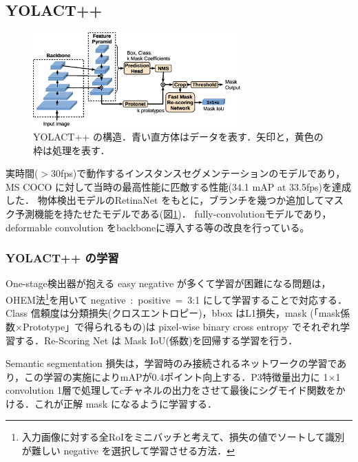 \documentclass[twocolumn]{jsarticle} %
\begin{document}
\subsection{YOLACT++ \cite{BZXL20}}
\begin{figure}[tb]
    \begin{center}
        \includegraphics[width=8cm,clip]{fig/archi_YOLACT++.eps}
    \end{center}
    \caption{ YOLACT++ の構造．青い直方体はデータを表す．矢印と，黄色の枠は処理を表す．}
    \label{fig:archi_yolactpp}
\end{figure}  
実時間(${>}$30fps)で動作するインスタンスセグメンテーションのモデルであり，MS COCO に対して当時の最高性能に匹敵する性能(34.1 mAP at 33.5fps)を達成した．
物体検出モデルのRetinaNet\cite{LGGHD17} をもとに，ブランチを幾つか追加してマスク予測機能を持たせたモデルである(図\ref{fig:archi_yolactpp})．
fully-convolutionモデルであり，deformable convolution をbackboneに導入する等の改良を行っている。
\subsubsection{YOLACT++ の学習}
One-stage検出器が抱える easy negative が多くて学習が困難になる問題は，OHEM法\footnote[3]{入力画像に対する全RoIをミニバッチと考えて、損失の値でソートして識別が難しい negative を選択して学習させる方法．}を用いて negative~:~positive~=~3:1 にして学習することで対応する．
Class 信頼度は分類損失(クロスエントロピー)，bbox はL1損失，mask (「mask係数×Prototype」で得られるもの)は pixel-wise binary cross entropy でそれぞれ学習する．Re-Scoring Net は Mask IoU(係数)を回帰する学習を行う．

Semantic segmentation 損失は，学習時のみ接続されるネットワークの学習であり，この学習の実施によりmAPが0.4ポイント向上する．P3特徴量出力に 1{$\times$}1 convolution 1層で処理してcチャネルの出力をさせて最後にシグモイド関数をかける．これが正解 mask になるように学習する．

\end{document}
